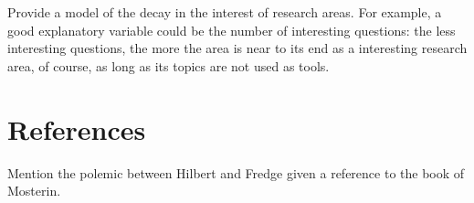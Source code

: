 {\color{red} Provide a model of the decay in the interest of research areas. For example, a good explanatory variable could be the number of interesting questions: the less interesting questions, the more the area is near to its end as a interesting research area, of course, as long as its topics are not used as tools.}

%
%

\section*{References}

{\color{red} Mention the polemic between Hilbert and Fredge given a reference to the book of Mosterin.}


